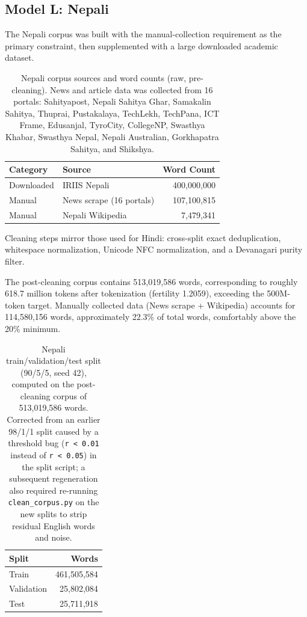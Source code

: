 \documentclass[11pt]{article}
\begin{document}
\subsection{Model L: Nepali}
The Nepali corpus was built with the manual-collection requirement as the primary constraint, then supplemented with a large downloaded academic dataset.

\begin{table}[h]
\centering
\begin{tabular}{lp{5cm}r}
\toprule
\textbf{Category} & \textbf{Source} & \textbf{Word Count} \\
\midrule
Downloaded & IRIIS Nepali & 400{,}000{,}000 \\
Manual & News scrape (16 portals) & 107{,}100{,}815 \\
Manual & Nepali Wikipedia & 7{,}479{,}341 \\
\bottomrule
\end{tabular}
\caption{Nepali corpus sources and word counts (raw, pre-cleaning). News and article data was collected from 16 portals: Sahityapost, Nepali Sahitya Ghar, Samakalin Sahitya, Thuprai, Pustakalaya, TechLekh, TechPana, ICT Frame, Edusanjal, TyroCity, CollegeNP, Swasthya Khabar, Swasthya Nepal, Nepali Australian, Gorkhapatra Sahitya, and Shikshya.}
\end{table}

Cleaning steps mirror those used for Hindi: cross-split exact deduplication, whitespace normalization, Unicode NFC normalization, and a Devanagari purity filter.

The post-cleaning corpus contains 513,019,586 words, corresponding to roughly 618.7 million tokens after tokenization (fertility 1.2059), exceeding the 500M-token target. Manually collected data (News scrape + Wikipedia) accounts for 114,580,156 words, approximately 22.3\% of total words, comfortably above the 20\% minimum.

\begin{table}[h]
\centering
\begin{tabular}{lr}
\toprule
\textbf{Split} & \textbf{Words} \\
\midrule
Train & 461{,}505{,}584 \\
Validation & 25{,}802{,}084 \\
Test & 25{,}711{,}918 \\
\bottomrule
\end{tabular}
\caption{Nepali train/validation/test split (90/5/5, seed 42), computed on the post-cleaning corpus of 513,019,586 words. Corrected from an earlier 98/1/1 split caused by a threshold bug (\texttt{r < 0.01} instead of \texttt{r < 0.05}) in the split script; a subsequent regeneration also required re-running \texttt{clean\_corpus.py} on the new splits to strip residual English words and noise.}
\end{table}
\end{document}
